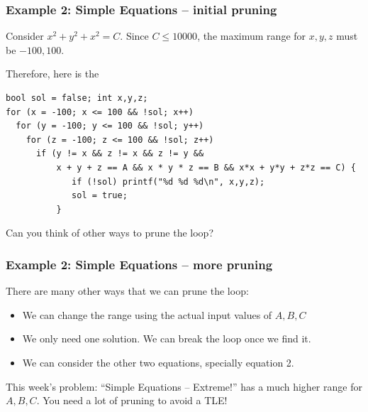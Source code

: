\documentclass{beamer}
\begin{document}

\begin{frame}[fragile]
  \frametitle{Example 2: Simple Equations -- initial pruning}

  \begin{block}{}
    Consider $x^2 + y^2 + x^2 = C$. Since $C \leq 10000$, the maximum
    range for $x,y,z$ must be $-100, 100$.
    
    \bigskip

    Therefore, here is the     
  \end{block}

{\smaller
\begin{verbatim}
bool sol = false; int x,y,z;
for (x = -100; x <= 100 && !sol; x++)
  for (y = -100; y <= 100 && !sol; y++)
    for (z = -100; z <= 100 && !sol; z++)
      if (y != x && z != x && z != y &&
          x + y + z == A && x * y * z == B && x*x + y*y + z*z == C) {
             if (!sol) printf("%d %d %d\n", x,y,z);
             sol = true;
          }
\end{verbatim}

\begin{block}{}
  Can you think of other ways to prune the loop?

  
\end{block}
}
\end{frame}

\begin{frame}
  \frametitle{Example 2: Simple Equations -- more pruning}
  There are many other ways that we can prune the loop:

  \medskip

  \begin{itemize}
  \item We can change the range using the actual input values of $A,B,C$
  \item We only need one solution. We can break the loop once we find it.
  \item We can consider the other two equations, specially equation 2.
  \end{itemize}

  \vfill

  \begin{alertblock}{}
    This week's problem: ``Simple Equations -- Extreme!'' has a much
    higher range for $A,B,C$. You need a lot of pruning to avoid a TLE!
  \end{alertblock}
\end{frame}
\end{document}
